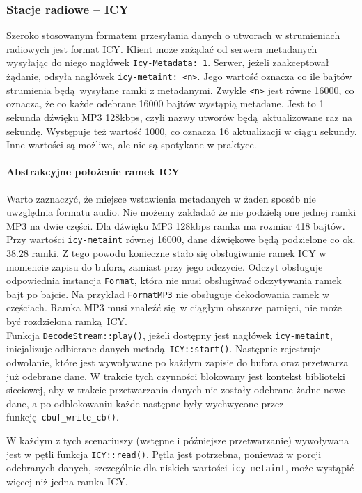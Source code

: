 \documentclass[polish]{aghengthesis}
\begin{document}
		\subsubsection{Stacje radiowe -- ICY}
			Szeroko stosowanym formatem przesyłania danych o utworach w strumieniach radiowych jest format ICY\textsuperscript{\cite{icy_spec}}. Klient może zażądać od serwera metadanych wysyłając do niego nagłówek \lstinline|Icy-Metadata: 1|. Serwer, jeżeli zaakceptował żądanie, odsyła nagłówek \lstinline|icy-metaint: <n>|. Jego wartość oznacza co ile bajtów strumienia będą wysyłane ramki z metadanymi. Zwykle \lstinline|<n>| jest równe 16000, co oznacza, że co każde odebrane 16000 bajtów wystąpią metadane. Jest to 1 sekunda dźwięku MP3 128kbps, czyli nazwy utworów będą aktualizowane raz na sekundę. Występuje też wartość 1000, co oznacza 16 aktualizacji w ciągu sekundy. Inne wartości są możliwe, ale nie są spotykane w praktyce.
			
			\paragraph{Abstrakcyjne położenie ramek ICY}
				Warto zaznaczyć, że miejsce wstawienia metadanych w żaden sposób nie uwzględnia formatu audio. Nie możemy zakładać że nie podzielą one jednej ramki MP3 na dwie części. Dla dźwięku MP3 128kbps ramka ma rozmiar 418 bajtów. Przy wartości \lstinline|icy-metaint| równej 16000, dane dźwiękowe będą podzielone co ok. $38.28$ ramki. Z tego powodu konieczne stało się obsługiwanie ramek ICY w momencie zapisu do bufora, zamiast przy jego odczycie. Odczyt obsługuje odpowiednia instancja \lstinline|Format|, która nie musi obsługiwać odczytywania ramek bajt po bajcie. Na przykład \lstinline|FormatMP3| nie obsługuje dekodowania ramek w częściach. Ramka MP3 musi znaleźć się w ciągłym obszarze pamięci, nie może być rozdzielona ramką ICY.
			$ $\\
			
			Funkcja \lstinline|DecodeStream::play()|, jeżeli dostępny jest nagłówek \lstinline|icy-metaint|, inicjalizuje odbierane danych metodą \lstinline|ICY::start()|. Następnie rejestruje odwołanie, które jest wywoływane po każdym zapisie do bufora oraz przetwarza już odebrane dane. W trakcie tych czynności blokowany jest kontekst biblioteki sieciowej, aby w trakcie przetwarzania danych nie zostały odebrane żadne nowe dane, a po odblokowaniu każde następne były wychwycone przez funkcję \lstinline|cbuf_write_cb()|.
			
			W każdym z tych scenariuszy (wstępne i późniejsze przetwarzanie) wywoływana jest w pętli funkcja \lstinline|ICY::read()|. Pętla jest potrzebna, ponieważ w porcji odebranych danych, szczególnie dla niskich wartości \lstinline|icy-metaint|, może wystąpić więcej niż jedna ramka ICY.
			
\end{document}
